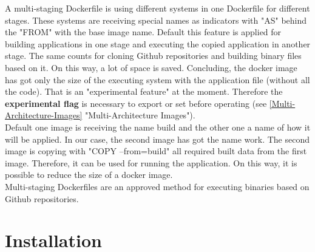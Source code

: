 A multi-staging Dockerfile is using different systems in one Dockerfile for different stages. These systems are receiving special names as indicators with "AS" behind the "FROM" with the base image name. 
Default this feature is applied for building applications in one stage and executing the copied application in another stage. The same counts for cloning Github repositories and building binary files based on it. On this way, a lot of space is saved.
Concluding, the docker image has got only the size of the executing system with the application file (without all the code). 
That is an "experimental feature"  at the moment. Therefore the \textbf{experimental flag} is necessary to export or set before operating (see \ref{Multi-Architecture-Images} "Multi-Architecture Images"). \\
Default one image is receiving the name build and the other one a name of how it will be applied. In our case, the second image has got the name work. 
The second image is copying with "COPY --from=build" all required built data from the first image. Therefore, it can be used for running the application. 
On this way, it is possible to reduce the size of a docker image. \\
Multi-staging Dockerfiles are an approved method for executing binaries based on Github repositories.


\section{Installation}


